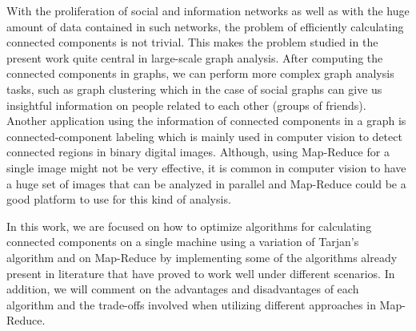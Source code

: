 With the proliferation of social and information networks as well as with the huge amount of data contained in such networks, the problem of efficiently calculating connected components is not trivial. This makes the problem studied in the present work quite central in large-scale graph analysis. After computing the connected components in graphs, we can perform more complex graph analysis tasks, such as graph clustering which in the case of social graphs can give us insightful information on people related to each other (\eg groups of friends). Another application using the information of connected components in a graph is connected-component labeling which is mainly used in computer vision to detect connected regions in binary digital images. Although, using Map-Reduce for a single image might not be very effective, it is common in computer vision to have a huge set of images that can be analyzed in parallel and Map-Reduce could be a good platform to use for this kind of analysis.

In this work, we are focused on how to optimize algorithms for calculating connected components on a single machine using a variation of Tarjan's algorithm and on Map-Reduce by implementing some of the algorithms already present in literature that have proved to work well under different scenarios. In addition, we will comment on the advantages and disadvantages of each algorithm and the trade-offs involved when utilizing different approaches in Map-Reduce.


